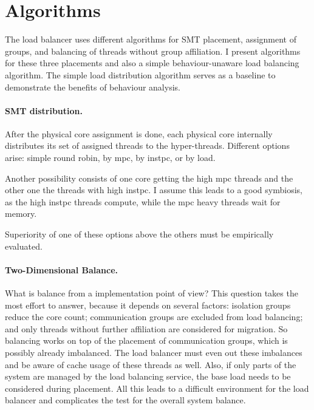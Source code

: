\section{Algorithms}
\label{impl:algos}


The load balancer uses different algorithms for SMT placement, assignment of
groups, and balancing of threads without group affiliation.
I present algorithms for these three placements and also a simple behaviour-unaware
load balancing algorithm.
The simple load distribution algorithm serves as a baseline to demonstrate the
benefits of behaviour analysis.

\paragraph{SMT distribution.}
After the physical core assignment is done, each physical core internally
distributes its set of assigned threads to the hyper-threads.
Different options arise: simple round robin, by \gls{mpc}, by \gls{instpc}, or
by load.

Another possibility consists of one core getting the high \gls{mpc}
threads and the other one the threads with high \gls{instpc}.
I assume this leads to a good symbiosis, as the high \gls{instpc} threads compute,
while the \gls{mpc} heavy threads wait for memory.

Superiority of one of these options above the others must be empirically evaluated.


\paragraph{Two-Dimensional Balance.}
What is balance from a implementation point of view?
This question takes the most effort to answer, because it
depends on several factors: isolation groups reduce the core count;
communication groups are excluded from load balancing;
and only threads without further affiliation are considered for migration.
So balancing works on top of the placement of communication groups, which is
possibly already imbalanced.
The load balancer must even out these imbalances and be aware of cache usage of
these threads as well.
Also, if only parts of the system are managed by the load balancing service,
the base load needs to be considered during placement.
All this leads to a difficult environment for the load balancer and complicates
the test for the overall system balance.

